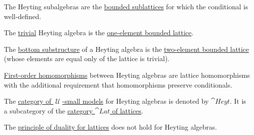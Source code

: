 \begin{definition}
\begin{thmenum}[resume=def:heyting_algebra]
     The Heyting subalgebras are the \hyperref[def:semilattice/submodel]{bounded sublattices} for which the conditional is well-defined.

     The \hyperref[rem:trivial_structure]{trivial} Heyting algebra is the \hyperref[def:semilattice/trivial]{one-element bounded lattice}.

     The \hyperref[thm:substructures_form_complete_lattice/bottom]{bottom substructure} of a Heyting algebra is the \hyperref[def:semilattice/trivial]{two-element bounded lattice} (whose elements are equal only of the lattice is trivial).

     \hyperref[def:first_order_homomorphism]{First-order homomorphisms} between Heyting algebras are lattice homomorphisms with the additional requirement that homomorphisms preserve conditionals.

     The \hyperref[def:category_of_small_first_order_models]{category of \( \mscrU \)-small models} for Heyting algebras is denoted by \( \cat{Heyt} \). It is a subcategory of the \hyperref[def:semilattice/category]{category \( \cat{Lat} \) of lattices}.

     The \hyperref[def:semilattice/duality]{principle of duality for lattices} does not hold for Heyting algebras.
  \end{thmenum}
\end{definition}

